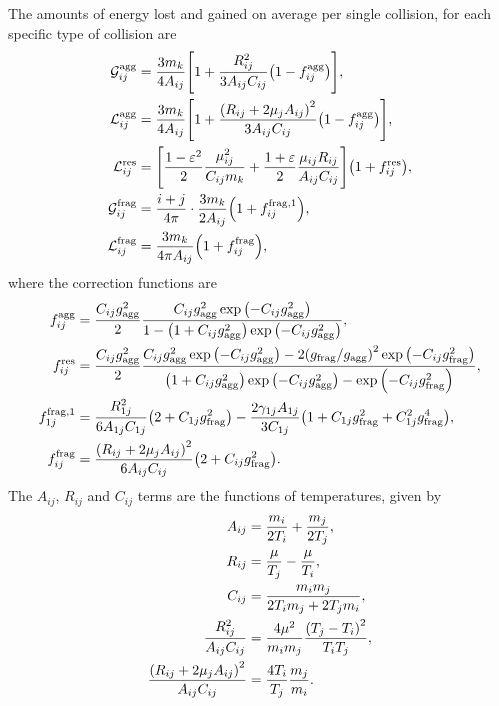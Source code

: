 \documentclass[aps,prl,preprint,groupedaddress,10pt]{revtex4-2}
\begin{document}
The amounts of energy lost and gained on average per single collision, for each
specific type of collision are
\begin{equation}
    \begin{split}
        \utx{\mathcal{G}}{agg}_{ij}&=\frac{3m_k}{4A_{ij}}
        \bqty{1+\frac{R_{ij}^2}{3A_{ij}C_{ij}}\pqty{1-\utx{f}{agg}_{ij}}},\\
        \utx{\mathcal{L}}{agg}_{ij}&=\frac{3m_k}{4A_{ij}}
        \bqty{1+\frac{\pqty{R_{ij}+2\mu_jA_{ij}}^2}{3A_{ij}C_{ij}}
        \pqty{1-\utx{f}{agg}_{ij}}},\\
        \utx{\mathcal{L}}{res}_{ij}&=\bqty{\frac{1-\eps^2}{2}\frac{\mu_{ij}^2}{C_{ij}m_k}+
        \frac{1+\eps}{2}\frac{\mu_{ij}R_{ij}}{A_{ij}C_{ij}}}\pqty{1+\utx{f}{res}_{ij}},\\
        \utx{\mathcal{G}}{frag}_{ij}&=\frac{i+j}{4\pi}\cdot\frac{3m_k}{2A_{ij}}
        \pqty{1+\utx{f}{frag,1}_{ij}},\\
        \utx{\mathcal{L}}{frag}_{ij}&=\frac{3m_k}{4\pi A_{ij}}\pqty{1+\utx{f}{frag}_{ij}},
    \end{split}
\end{equation}
where the correction functions are
\begin{equation}
    \begin{split}
        \utx{f}{agg}_{ij}&=\frac{C_{ij}\ltx{g}{agg}^2}{2}
        \frac{C_{ij}\ltx{g}{agg}^2\exp\pqty{-C_{ij}\ltx{g}{agg}^2}}
        {1-\pqty{1+C_{ij}\ltx{g}{agg}^2}\exp\pqty{-C_{ij}\ltx{g}{agg}^2}},\\
        \utx{f}{res}_{ij}&=\frac{C_{ij}\ltx{g}{agg}^2}{2}
        \frac{C_{ij}\ltx{g}{agg}^2\exp\pqty{-C_{ij}\ltx{g}{agg}^2}-
        2\pqty{\ltx{g}{frag}/\ltx{g}{agg}}^2\exp\pqty{-C_{ij}\ltx{g}{frag}^2}}
        {\pqty{1+C_{ij}\ltx{g}{agg}^2}\exp\pqty{-C_{ij}\ltx{g}{agg}^2}-
        \exp\pqty{-C_{ij}\ltx{g}{frag}^2}},\\
        \utx{f}{frag,1}_{1j}&=\frac{R_{1j}^2}{6A_{1j}C_{1j}}
        \pqty{2+C_{1j}\ltx{g}{frag}^2}-\frac{2\gamma_{1j}A_{1j}}{3C_{1j}}
        \pqty{1+C_{1j}\ltx{g}{frag}^2+C_{1j}^2\ltx{g}{frag}^4},\\
        \utx{f}{frag}_{ij}&=\frac{\pqty{R_{ij}+2\mu_jA_{ij}}^2}{6A_{ij}C_{ij}}
        \pqty{2+C_{ij}\ltx{g}{frag}^2}.
    \end{split}
\end{equation}
The $A_{ij}$, $R_{ij}$ and $C_{ij}$ terms are the functions of temperatures, given by
\begin{equation}
    \begin{split}
        A_{ij} &= \frac{m_i}{2T_i}+\frac{m_j}{2T_j},\\
        R_{ij} &= \frac{\mu}{T_j}-\frac{\mu}{T_i},\\
        C_{ij} &= \frac{m_im_j}{2T_im_j+2T_jm_i},\\
        \frac{R_{ij}^2}{A_{ij}C_{ij}} &= \frac{4\mu^2}{m_im_j}
        \frac{\pqty{T_j-T_i}^2}{T_iT_j},\\
        \frac{\pqty{R_{ij}+2\mu_jA_{ij}}^2}{A_{ij}C_{ij}} &=
        \frac{4T_i}{T_j}\frac{m_j}{m_i}.
    \end{split}
\end{equation}
\end{document}
